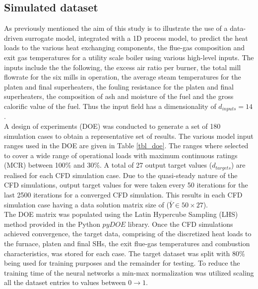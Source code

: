 \documentclass[a4paper,fleqn]{cas-dc}
\begin{document}
\subsection{Simulated dataset}
As previously mentioned the aim of this study is to illustrate the use of a data-driven surrogate model, integrated with a 1D process model, to predict the heat loads to the various heat exchanging components, the flue-gas composition and exit gas temperatures for a utility scale boiler using various high-level inputs. The inputs include the the following, the excess air ratio per burner, the total mill flowrate for the six mills in operation, the average steam temperatures for the platen and final superheaters, the fouling resistance for the platen and final superheaters, the composition of ash and moisture of the fuel and the gross calorific value of the fuel. Thus the input field has a dimensionality of $d_{inputs}=14$.\\

A design of experiments (DOE) was conducted to generate a set of 180 simulation cases to obtain a representative set of results. The various model input ranges used in the DOE are given in Table \ref{tbl_doe}. The ranges where selected to cover a wide range of operational loads with maximum continuous ratings (MCR) between 100\% and 30\%. A total of 27 output target values ($d_{targets}$) are realised for each CFD simulation case. Due to the quasi-steady nature of the CFD simulations, output target values for were taken every 50 iterations for the last 2500 iterations for a converged CFD simulation. This results in each CFD simulation case having a data solution matrix size of ($\bar{Y}\in50\times27$).\\

The DOE matrix was populated using the Latin Hypercube Sampling (LHS) method provided in the Python $pyDOE$ library. Once the CFD simulations achieved convergence, the target data, comprising of the discretized heat loads to the furnace, platen and final SHs, the exit flue-gas temperatures and combustion characteristics, was stored for each case. The target dataset was split with 80\% being used for training purposes and the remainder for testing. To reduce the training time of the neural networks a min-max normalization was utilized scaling all the dataset entries to values between $0\rightarrow1$.\\
\end{document}
